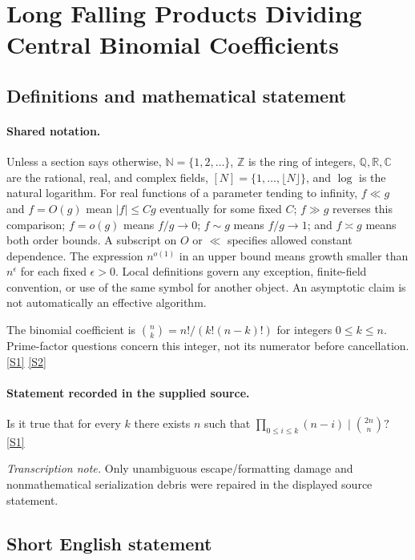 \documentclass[11pt,a4paper]{article}
\newcommand{\N}{\mathbb{N}}
\newcommand{\Z}{\mathbb{Z}}
\newcommand{\Q}{\mathbb{Q}}
\newcommand{\R}{\mathbb{R}}
\newcommand{\C}{\mathbb{C}}
\newcommand{\sref}[2]{\hyperlink{source:#1:#2}{[S#2]}}
\begin{document}
\section{Long Falling Products Dividing Central Binomial Coefficients}\label{statement}


\subsection{Definitions and mathematical statement}

\paragraph{Shared notation.}Unless a section says otherwise, $\N=\{1,2,\ldots\}$,
$\Z$ is the ring of integers, $\Q,\R,\C$ are the rational, real, and complex
fields, $[N]=\{1,\ldots,\lfloor N\rfloor\}$, and $\log$ is the natural
logarithm. For real functions of a parameter tending to infinity,
$f\ll g$ and $f=O(g)$ mean $|f|\leq Cg$ eventually for some fixed $C$;
$f\gg g$ reverses this comparison; $f=o(g)$ means $f/g\to0$;
$f\sim g$ means $f/g\to1$; and $f\asymp g$ means both order bounds.
A subscript on $O$ or $\ll$ specifies allowed constant dependence.
The expression $n^{o(1)}$ in an upper bound means growth smaller than
$n^\epsilon$ for each fixed $\epsilon>0$. Local definitions govern any
exception, finite-field convention, or use of the same symbol for another
object. An asymptotic claim is not automatically an effective algorithm.



The binomial coefficient is $\binom nk=n!/(k!(n-k)!)$ for integers $0\leq k\leq n$. Prime-factor questions concern this integer, not its numerator before cancellation. \sref{statement}{1} \sref{statement}{2}

\paragraph{Statement recorded in the supplied source.}
Is it true that for every $k$ there exists $n$ such that $ \prod_{0\leq i\leq k}(n-i) \mid \binom{2n}{n}? $ \sref{statement}{1}

{\small\emph{Transcription note.} Only unambiguous escape/formatting damage and nonmathematical serialization debris were repaired in the displayed source statement.}

\subsection{Short English statement}
\end{document}
